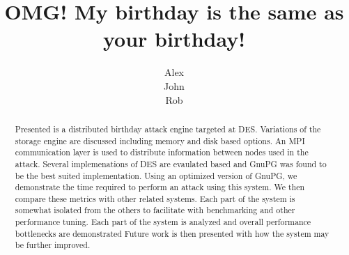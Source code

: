 \documentclass[letterpaper,twocolumn]{article}
\title{OMG! My birthday is the same as your birthday!}
\author{Alex \\ John \\ Rob}
\begin{document}
\maketitle
\begin{abstract}
Presented is a distributed birthday attack engine targeted at DES.  
Variations of the storage engine are discussed including memory and disk based options.  
An MPI communication layer is used to distribute information between nodes used in the attack.  
Several implemenations of DES are evaulated based and GnuPG was found to be the best suited implementation.
Using an optimized version of GnuPG,
we demonstrate the time required to perform an attack using this system.  
We then compare these metrics with other related systems.
Each part of the system is somewhat isolated from the others to facilitate with benchmarking 
and other performance tuning.  Each part of the system is analyzed and overall performance
bottlenecks are demonstrated
Future work is then presented with how the system may be further
 improved.

\end{abstract}








\end{document}
